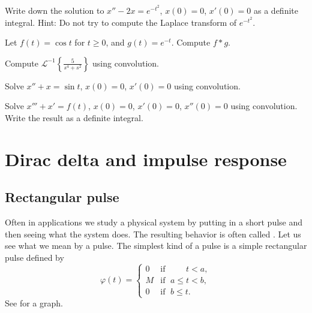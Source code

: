 \begin{exercise}
Write down the solution to
$x''-2x=e^{-t^2}$, $x(0)=0$, $x'(0)=0$ as a
definite integral.  Hint: Do not try to compute the
Laplace transform of $e^{-t^2}$.
\end{exercise}

\setcounter{exercise}{100}

\begin{exercise}
Let $f(t) = \cos t$ for $t \geq 0$, and $g(t) = e^{-t}$.  Compute
$f * g$.
\end{exercise}

\begin{exercise}
Compute ${\mathcal{L}}^{-1} \left\{ \frac{5}{s^4+s^2} \right\}$ using
convolution.
\end{exercise}


\begin{exercise}
Solve $x''+x = \sin t$, $x(0) = 0$, $x'(0)=0$ using convolution.
\end{exercise}

\begin{exercise}
Solve $x'''+x' = f(t)$, $x(0) = 0$, $x'(0)=0$, $x''(0)=0$ using convolution.
Write the result as a definite integral.
\end{exercise}



\sectionnewpage
\section{Dirac delta and impulse response}
\label{diracdelta:section}


\subsection{Rectangular pulse}

Often in applications we study a physical system by putting in a short pulse 
and then seeing what the system does.  The resulting behavior is
often called \emph{}.
Let us see what we mean by a pulse.
The simplest kind of a pulse is a simple rectangular pulse defined by
\begin{equation*}
\varphi(t) = 
\begin{cases}
0 & \text{if } \; \phantom{a \leq {}} t < a , \\
M & \text{if } \; a \leq t < b , \\
0 & \text{if } \; b \leq t .
\end{cases}
\end{equation*}
See  for a graph.

